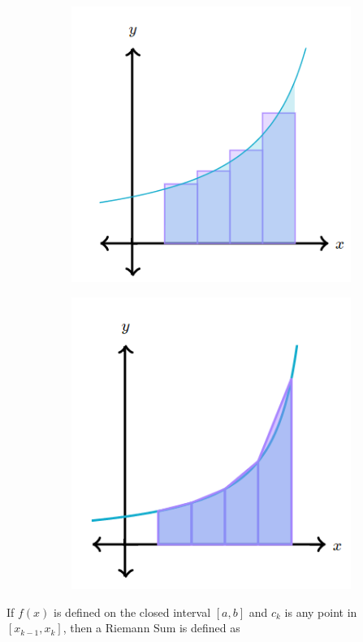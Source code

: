 \documentclass{article}
\begin{document}
            \begin{figure}[hbt!]
                \centering
                \begin{subfigure}[b]{.45\textwidth}
                    \includegraphics[scale=0.8]{Resources/Unit4Integration/Riemann_Mid}
                \end{subfigure}
                \begin{subfigure}[b]{.45\textwidth}
                    \includegraphics[scale=0.8]{Resources/Unit4Integration/Riemann_Trapezoid}
                \end{subfigure}
            \end{figure}

            \noindent If $f(x)$ is defined on the closed interval $[a,b]$ and $c_k$ is any point in
            $[x_{k-1}, x_k]$, then a Riemann Sum is defined as
\end{document}
